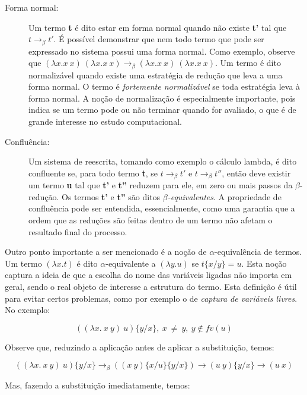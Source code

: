 \begin{description}
    \item[Forma normal:] Um termo \textbf{t} é dito estar em forma
    normal quando não existe \textbf{t'} tal que $ t \rightarrow_\beta t' $. 
    É possível demonstrar que nem todo termo que pode ser expressado no sistema
    possui uma forma normal. Como exemplo, observe que $ (\lambda x.x\ x)\ (\lambda
    x.x\ x) \rightarrow_\beta (\lambda x.x\ x)\ (\lambda x.x\ x) $. Um termo é
    dito normalizável quando existe uma estratégia de redução que leva a uma
    forma normal. O termo é \emph{fortemente normalizável} se toda estratégia
    leva à forma normal. A noção de normalização é especialmente importante,
    pois indica se um termo pode ou não terminar quando for avaliado, o que é de
    grande interesse no estudo computacional.

    \item[Confluência:] Um sistema de reescrita, tomando como exemplo o cálculo
    lambda, é dito confluente se, para todo termo \textbf{t}, se $ t
    \rightarrow_\beta t' $ e $ t \rightarrow_\beta t'' $, então deve existir
    um termo \textbf{u} tal que \textbf{t'} e \textbf{t''} reduzem para ele,
    em zero ou mais passos da $\beta$-redução.  Os termos \textbf{t'} e
    \textbf{t''} são ditos \textit{$\beta$-equivalentes}.  A propriedade de
    confluência pode ser entendida, essencialmente, como uma garantia que a
    ordem que as reduções são feitas dentro de um termo não afetam o
    resultado final do processo.
\end{description}

Outro ponto importante a ser mencionado é a noção de $\alpha$-equivalência de
termos. Um termo $(\lambda x. t)$ é dito $\alpha$-equivalente a $(\lambda y. u)$
se $ t\{x/y\} = u $. Esta noção captura a ideia de que a escolha do nome das
variáveis ligadas não importa em geral, sendo o real objeto de interesse a
estrutura do termo. Esta definição é útil para evitar certos problemas, como por
exemplo o de \textit{captura de variáveis livres}. No exemplo:

\[ ((\lambda x.\ x\ y)\ u)\{y/x\},\ x\ \neq\ y,\ y  \notin fv(u) \]

Observe que, reduzindo a aplicação antes de aplicar a substituição, temos:


\[ ((\lambda x.\ x\ y)\ u)\{y/x\} \rightarrow_\beta ((x\ y)\{x/u\}\{y/x\})
\rightarrow (u\ y)\{y/x\} \rightarrow (u\ x) \]

Mas, fazendo a substituição imediatamente, temos:

